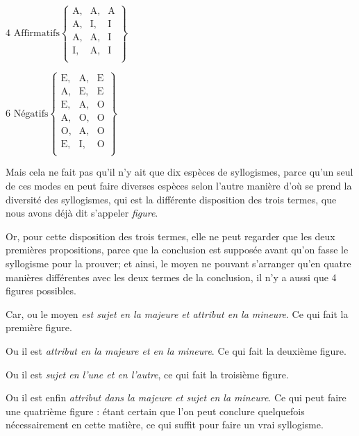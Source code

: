 \begin{center}
$ \text {4 Affirmatifs} \left \{
    \begin{array}{ccc}
	    \text {A,} & \text{A,} & \text{A} \\
  	    \text {A,} & \text{I,} & \text{I} \\
  	    \text {A,} & \text{A,} & \text{I} \\
  	    \text {I,} & \text{A,} & \text{I} \\
    \end{array}
	    \right \} $
\end{center}
\begin{center}
$ \text {6 Négatifs} \left \{
    \begin{array}{ccc}
	    \text {E,} & \text{A,} & \text{E} \\
	    \text {A,} & \text{E,} & \text{E} \\
	    \text {E,} & \text{A,} & \text{O} \\
	    \text {A,} & \text{O,} & \text{O} \\
	    \text {O,} & \text{A,} & \text{O} \\
	    \text {E,} & \text{I,} & \text{O} \\
    \end{array}
	    \right \} $
\end{center}

Mais cela ne fait pas qu'il n'y ait que dix espèces de syllogismes, parce qu'un seul de ces modes en peut faire diverses espèces selon l'autre manière d'où se prend la diversité des syllogismes, qui est la différente disposition des trois termes, que nous avons déjà dit s'appeler \emph{figure}.

Or, pour cette disposition des trois termes, elle ne peut regarder que les deux premières propositions, parce que la conclusion est supposée avant qu'on fasse le syllogisme pour la prouver; et ainsi, le moyen ne pouvant s'arranger qu'en quatre manières différentes avec les deux termes de la conclusion, il n'y a aussi que 4 figures possibles.

Car, ou le moyen \emph{est sujet en la majeure et attribut en la mineure}. Ce qui fait la première figure.

Ou il est \emph{attribut en la majeure et en la mineure}. Ce qui fait la deuxième figure.

Ou il est \emph{sujet en l'une et en l'autre}, ce qui fait la troisième figure.

Ou il est enfin \emph{attribut dans la majeure et sujet en la mineure}. Ce qui peut faire une quatrième figure : étant certain que l'on peut conclure quelquefois nécessairement en cette matière, ce qui suffit pour faire un vrai syllogisme.

